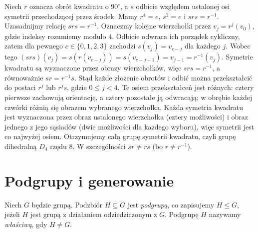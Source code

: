 \begin{przyklad}
\label{aa:prz:d4}
Niech $r$ oznacza obrót kwadratu o $90^\circ$,
a $s$ odbicie względem ustalonej osi symetrii przechodzącej
przez środek. Mamy $r^4=e$, $s^2=e$ i $srs=r^{-1}$.
Uzasadnijmy relację $srs=r^{-1}$. Oznaczmy kolejne wierzchołki
przez $v_j=r^j(v_0)$, gdzie indeksy rozumiemy modulo $4$.
Odbicie odwraca ich porządek cykliczny, zatem dla pewnego
$c\in\{0,1,2,3\}$ zachodzi $s(v_j)=v_{c-j}$ dla każdego $j$.
Wobec tego
$(srs)(v_j)=s(r(v_{c-j}))=s(v_{c-j+1})=v_{j-1}=r^{-1}(v_j)$.
Symetrie kwadratu są wyznaczone przez obrazy wierzchołków,
więc $srs=r^{-1}$, a równoważnie $sr=r^{-1}s$.
Stąd każde złożenie obrotów i odbić można przekształcić do
postaci $r^j$ lub $r^js$, gdzie $0\le j<4$.
Te osiem przekształceń jest różnych: cztery pierwsze zachowują
orientację, a cztery pozostałe ją odwracają; w obrębie każdej
czwórki różnią się obrazem wybranego wierzchołka.
Każda symetria kwadratu jest wyznaczona przez obraz ustalonego
wierzchołka (cztery możliwości) i obraz jednego z jego sąsiadów
(dwie możliwości dla każdego wyboru), więc symetrii jest co
najwyżej osiem. Otrzymujemy całą grupę symetrii kwadratu,
czyli grupę dihedralną $D_4$ rzędu $8$.
W szczególności $sr\ne rs$ (bo $r\ne r^{-1}$).
\end{przyklad}

\section{Podgrupy i generowanie}
\begin{definicja}[Podgrupa]
Niech $G$ będzie grupą. Podzbiór $H\subseteq G$ jest
\emph{podgrupą}, co zapisujemy $H\le G$, jeżeli
$H$ jest grupą z działaniem odziedziczonym z $G$.
Podgrupę $H$ nazywamy \emph{właściwą}, gdy $H\ne G$.
\end{definicja}

